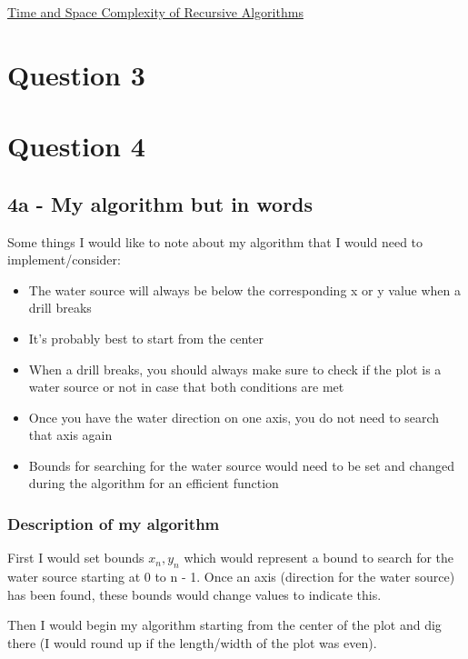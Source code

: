 \documentclass[oneside, a4paper]{article}
\begin{document}
\href{https://www.ideserve.co.in/learn/time-and-space-complexity-of-recursive-algorithms}{Time and Space Complexity of Recursive Algorithms}

\newpage
\setcounter{secnumdepth}{-1}
\section{Question 3}

\newpage
\setcounter{secnumdepth}{-1}
\section{Question 4}
\subsection*{4a - My algorithm but in words}
Some things I would like to note about my algorithm that I would need to implement/consider:
\begin{itemize}
    \item The water source will always be below the corresponding x or y value when a drill breaks 
    \item It's probably best to start from the center
    \item When a drill breaks, you should always make sure to check if the plot is a water source or not in case that both conditions are met
    \item Once you have the water direction on one axis, you do not need to search that axis again
    \item Bounds for searching for the water source would need to be set and changed during the algorithm for an efficient function
\end{itemize}

\subsubsection*{Description of my algorithm}
First I would set bounds $x_n, y_n$ which would represent a bound to search for the water source starting at 0 to n - 1. Once an axis (direction for the water source) has been found, these bounds would change values to indicate this.

Then I would begin my algorithm starting from the center of the plot and dig there (I would round up if the length/width of the plot was even). 
\end{document}
